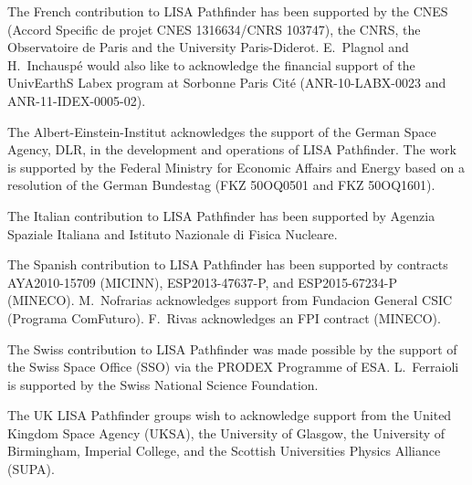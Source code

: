 \documentclass[twocolumn, trackchanges]{aastex62}
\begin{document}
The French contribution to LISA Pathfinder has been supported by the CNES (Accord Specific de projet
CNES 1316634/CNRS 103747), the CNRS, the Observatoire de Paris and the University
Paris-Diderot. E.~Plagnol and H.~Inchausp\'{e} would also like to acknowledge the
financial support of the UnivEarthS Labex program at Sorbonne Paris Cit\'{e}
(ANR-10-LABX-0023 and ANR-11-IDEX-0005-02).

The Albert-Einstein-Institut acknowledges the support of the German Space Agency,
DLR, in the development and operations of LISA Pathfinder. The work is supported by the Federal Ministry for Economic Affairs and Energy
based on a resolution of the German Bundestag (FKZ 50OQ0501 and FKZ 50OQ1601). 

The Italian contribution to LISA Pathfinder has been supported  by Agenzia Spaziale Italiana and Istituto
Nazionale di Fisica Nucleare.

The Spanish contribution to LISA Pathfinder has been supported by contracts AYA2010-15709 (MICINN),
ESP2013-47637-P, and ESP2015-67234-P (MINECO). M.~Nofrarias acknowledges support from
Fundacion General CSIC (Programa ComFuturo). F.~Rivas acknowledges an FPI contract
(MINECO).

The Swiss contribution to LISA Pathfinder was made possible by the support of the Swiss Space Office (SSO)
via the PRODEX Programme of ESA. L.~Ferraioli is supported by the Swiss National
Science Foundation.

The UK LISA Pathfinder groups wish to acknowledge support from the United Kingdom Space Agency
(UKSA), the University of Glasgow, the University of Birmingham, Imperial College,
and the Scottish Universities Physics Alliance (SUPA).

%

\vspace{5mm}

\end{document}
